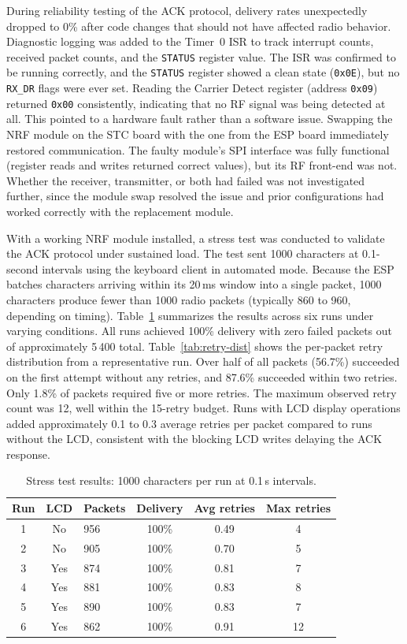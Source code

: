 \documentclass[12pt, a4paper]{article}
\begin{document}
During reliability testing of the ACK protocol, delivery rates unexpectedly dropped to 0\% after code changes that should not have affected radio behavior. Diagnostic logging was added to the Timer~0 ISR to track interrupt counts, received packet counts, and the \texttt{STATUS} register value. The ISR was confirmed to be running correctly, and the \texttt{STATUS} register showed a clean state (\texttt{0x0E}), but no \texttt{RX\_DR} flags were ever set. Reading the Carrier Detect register (address \texttt{0x09}) returned \texttt{0x00} consistently, indicating that no RF signal was being detected at all. This pointed to a hardware fault rather than a software issue. Swapping the NRF module on the STC board with the one from the ESP board immediately restored communication. The faulty module's SPI interface was fully functional (register reads and writes returned correct values), but its RF front-end was not. Whether the receiver, transmitter, or both had failed was not investigated further, since the module swap resolved the issue and prior configurations had worked correctly with the replacement module.

With a working NRF module installed, a stress test was conducted to validate the ACK protocol under sustained load. The test sent 1000 characters at 0.1-second intervals using the keyboard client in automated mode. Because the ESP batches characters arriving within its 20\,ms window into a single packet, 1000 characters produce fewer than 1000 radio packets (typically 860 to 960, depending on timing). Table~\ref{tab:stress-runs} summarizes the results across six runs under varying conditions. All runs achieved 100\% delivery with zero failed packets out of approximately 5\,400 total. Table~\ref{tab:retry-dist} shows the per-packet retry distribution from a representative run. Over half of all packets (56.7\%) succeeded on the first attempt without any retries, and 87.6\% succeeded within two retries. Only 1.8\% of packets required five or more retries. The maximum observed retry count was 12, well within the 15-retry budget. Runs with LCD display operations added approximately 0.1 to 0.3 average retries per packet compared to runs without the LCD, consistent with the blocking LCD writes delaying the ACK response.

\begin{table}[ht]
\centering
\caption{Stress test results: 1000 characters per run at 0.1\,s intervals.}
\label{tab:stress-runs}
\begin{tabular}{cclccc}
\hline
Run & LCD & Packets & Delivery & Avg retries & Max retries \\
\hline
1 & No  & 956 & 100\% & 0.49 & 4  \\
2 & No  & 905 & 100\% & 0.70 & 5  \\
3 & Yes & 874 & 100\% & 0.81 & 7  \\
4 & Yes & 881 & 100\% & 0.83 & 8  \\
5 & Yes & 890 & 100\% & 0.83 & 7  \\
6 & Yes & 862 & 100\% & 0.91 & 12 \\
\hline
\end{tabular}
\end{table}
\end{document}
